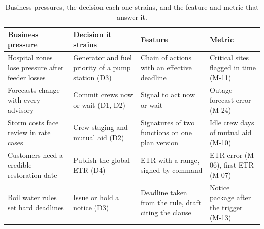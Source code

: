 \documentclass[fontsize=10pt,a4paper,DIV=12,parskip=half-,numbers=noenddot,headsepline,captions=tableheading]{scrartcl}
\begin{document}
\begin{table}[tb]\footnotesize
\caption{Business pressures, the decision each one strains, and the feature and metric that answer it.}\label{tab:pressure}
\begin{tabularx}{\textwidth}{@{}L{3.6cm} L{3.8cm} Y L{3.4cm}@{}}
  \toprule
  \textbf{Business pressure} & \textbf{Decision it strains} & \textbf{Feature} & \textbf{Metric} \\ \midrule
  Hospital zones lose pressure after feeder losses & Generator and fuel priority of a pump station (D3) & Chain of actions with an effective deadline & Critical sites flagged in time (M-11) \\ \lightrowrule
  Forecasts change with every advisory & Commit crews now or wait (D1, D2) & Signal to act now or wait & Outage forecast error (M-24) \\ \lightrowrule
  Storm costs face review in rate cases & Crew staging and mutual aid (D2) & Signatures of two functions on one plan version & Idle crew days of mutual aid (M-10) \\ \lightrowrule
  Customers need a credible restoration date & Publish the global ETR (D4) & ETR with a range, signed by command & ETR error (M-06), first ETR (M-07) \\ \lightrowrule
  Boil water rules set hard deadlines & Issue or hold a notice (D3) & Deadline taken from the rule, draft citing the clause & Notice package after the trigger (M-13) \\ \bottomrule
\end{tabularx}
\end{table}
\end{document}
